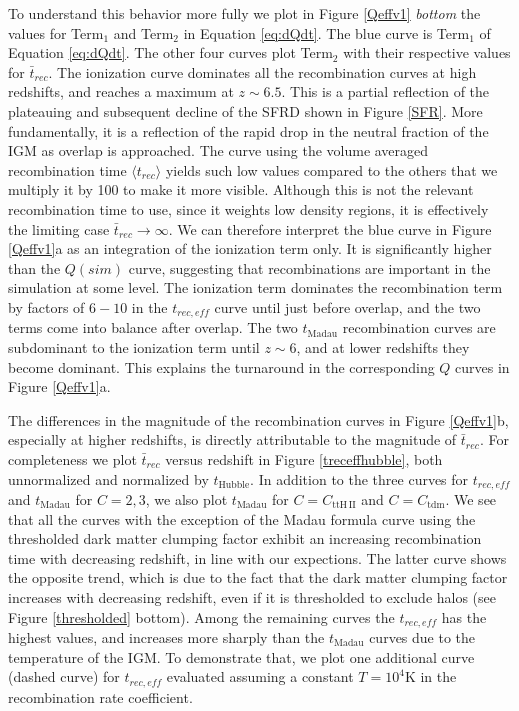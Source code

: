 To understand this behavior more fully we plot in Figure \ref{Qeffv1} {\em bottom} the values for Term$_1$ and Term$_2$ in Equation \eqref{eq:dQdt}. 
The blue curve is Term$_1$ of Equation \eqref{eq:dQdt}. The other four curves plot Term$_2$ with their respective values for $\bar{t}_{rec}$.  The ionization curve dominates all the recombination curves at high redshifts, and reaches a maximum at $z\sim 6.5$. 
This is a partial reflection of the plateauing and subsequent decline of the SFRD shown in Figure \ref{SFR}. More fundamentally, it is a reflection of the rapid drop in the neutral fraction of the IGM as overlap is approached.  
The curve using the volume averaged recombination time $\langle t_{rec}\rangle$ yields such low values compared to the others that we multiply it by 100 to make it more visible.  Although this is not the relevant recombination time to use, since it weights low density regions, it is effectively the limiting case $\bar{t}_{rec}\rightarrow \infty$.  We can therefore interpret the blue curve in Figure \ref{Qeffv1}a as an integration of the ionization term only. It is significantly higher than the $Q(sim)$ curve, suggesting that recombinations are important in the simulation at some level. The ionization term dominates the recombination term by factors of $6-10$ in the $t_{rec,eff}$ curve until just before overlap, and the two terms come into balance after overlap. The two $t_\mathrm{Madau}$ recombination curves are subdominant to the ionization term until $z \sim 6$, and at lower redshifts they become dominant. This explains the turnaround in the corresponding $Q$ curves in Figure \ref{Qeffv1}a. 

The differences in the magnitude of the recombination curves in Figure \ref{Qeffv1}b, especially at higher redshifts, is directly attributable to the magnitude of $\bar{t}_{rec}$. For completeness we plot $\bar{t}_{rec}$ versus redshift in Figure \ref{treceffhubble}, both unnormalized and normalized by $t_\mathrm{Hubble}$. In addition to the three curves for $t_{rec,eff}$ and $t_\mathrm{Madau}$ for $C=2, 3$, we also plot $t_\mathrm{Madau}$ for $C=C_\mathrm{ttH\,II}$ and $C=C_\mathrm{tdm}$. We see that all the curves with the exception of the Madau formula curve using the thresholded dark matter clumping factor exhibit an increasing recombination time with decreasing redshift, in line with our expections. The latter curve shows the opposite trend, which is due to the fact that the dark matter clumping factor increases with decreasing redshift, even if it is thresholded to exclude halos (see Figure \ref{thresholded} bottom). Among the remaining curves the $t_{rec,eff}$ has the highest values, and increases more sharply than the $t_\mathrm{Madau}$ curves due to the temperature of the IGM. To demonstrate that, we plot one additional curve (dashed curve) for $t_{rec,eff}$ evaluated assuming a constant $T=10^4$K in the recombination rate coefficient.

